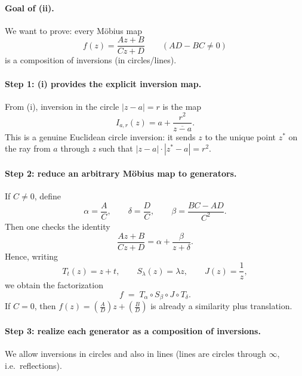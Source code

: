 \begin{problem}[CP-IV-0069]
	\paragraph{\textbf{Goal of (ii).}}
	We want to prove: every Möbius map
	\[
	f(z)=\frac{Az+B}{Cz+D}\qquad(AD-BC\neq 0)
	\]
	is a composition of inversions (in circles/lines).

	\paragraph{\textbf{Step 1: (i) provides the explicit inversion map.}}
	From (i), inversion in the circle $|z-a|=r$ is the map
	\[
	I_{a,r}(z)=a+\frac{r^{2}}{\overline{z-a}}.
	\]
	This is a genuine Euclidean circle inversion: it sends $z$ to the unique point $z^{*}$ on the ray from $a$ through $z$
	such that $|z-a|\cdot|z^{*}-a|=r^{2}$.

	\paragraph{\textbf{Step 2: reduce an arbitrary Möbius map to generators.}}
	If $C\neq 0$, define
	\[
	\alpha=\frac{A}{C},\qquad
	\delta=\frac{D}{C},\qquad
	\beta=\frac{BC-AD}{C^{2}}.
	\]
	Then one checks the identity
	\[
	\frac{Az+B}{Cz+D}=\alpha+\frac{\beta}{z+\delta}.
	\]
	Hence, writing
	\[
	T_t(z)=z+t,\qquad S_\lambda(z)=\lambda z,\qquad J(z)=\frac{1}{z},
	\]
	we obtain the factorization
	\[
	f \;=\; T_{\alpha}\circ S_{\beta}\circ J\circ T_{\delta}.
	\]
	If $C=0$, then $f(z)=\left(\frac{A}{D}\right)z+\left(\frac{B}{D}\right)$ is already a similarity plus translation.

	\paragraph{\textbf{Step 3: realize each generator as a composition of inversions.}}
	We allow inversions in circles and also in lines (lines are circles through $\infty$, i.e.\ reflections).
\end{problem}

